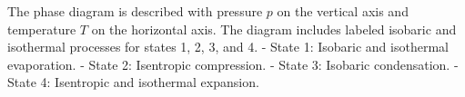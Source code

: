 The phase diagram is described with pressure \( p \) on the vertical axis and temperature \( T \) on the horizontal axis. The diagram includes labeled isobaric and isothermal processes for states 1, 2, 3, and 4.  
- State 1: Isobaric and isothermal evaporation.  
- State 2: Isentropic compression.  
- State 3: Isobaric condensation.  
- State 4: Isentropic and isothermal expansion.